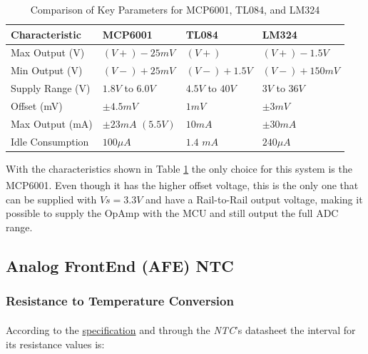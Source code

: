 \documentclass[12pt]{article}
\begin{document}
    \begin{table}[h]
        \centering
        \caption{Comparison of Key Parameters for MCP6001, TL084, and LM324}
        \begin{tabularx}{\textwidth}{>{\centering\arraybackslash}X >{\centering\arraybackslash}X >{\centering\arraybackslash}X >{\centering\arraybackslash}X}
            \toprule
            \textbf{Characteristic} & \textbf{MCP6001} & \textbf{TL084} & \textbf{LM324} \\
            \midrule
            Max Output (V) & $(V+)-25mV$ & $(V+)$ & $(V+) - 1.5V$ \\
            \midrule
            Min Output (V) & $(V-)+25mV$ & $(V-) + 1.5V$ & $(V-) + 150mV$ \\
            \midrule
            Supply Range (V) & $1.8V$ to $6.0V$ & $4.5V$ to $40V$ & $3V$ to $36V$ \\
            \midrule
            Offset (mV) & $\pm 4.5mV$ & $1mV$ & $\pm 3 mV$ \\
            \midrule
            Max Output (mA) & $\pm 23 mA$ $(5.5V)$ & $10 mA$ & $\pm 30 mA$ \\
            \midrule
            Idle Consumption & $100 \mu A $ & $1.4$ $mA$ & $240 \mu A$ \\
            \bottomrule
        \end{tabularx}
        \label{tab:opamp}
    \end{table}

    With the characteristics shown in Table \ref{tab:opamp} the only choice for this system is the MCP6001\textsuperscript{\cite{mcp-datasheet}}. Even though it has the higher offset voltage, this is the only one that can be supplied with $Vs=3.3V$ and have a Rail-to-Rail output voltage, making it possible to supply the OpAmp with the MCU and still output the full ADC range.


\subsection{Analog FrontEnd (AFE) NTC}

    \subsubsection{ Resistance to Temperature Conversion }

    According to the \hyperref[requirements]{specification} and through the \textit{NTC}'s datasheet \textsuperscript{\cite{NTC_datasheet}} the interval for its resistance values is:
    
\end{document}
